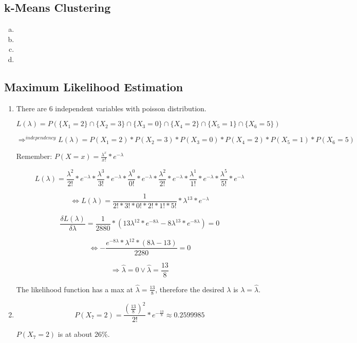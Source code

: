 \documentclass[12pt]{article}
\begin{document}

\setcounter{section}{4}

\subsection{k-Means Clustering}
\begin{enumerate}[a)]

    \item 
      

    \item 

    \item 

    \item 
        
\end{enumerate}

\subsection{Maximum Likelihood Estimation}

	\begin{enumerate}
	
	\item

	There are 6 independent variables with poisson distribution.
	
	$$L(\lambda)= P(\{X_1=2\} \cap \{X_2=3\} \cap \{X_3=0\} \cap \{X_4=2\} \cap \{X_5=1\} \cap \{X_6=5\})$$
	
	$$\Rightarrow^{independency} L(\lambda)= P(X_1=2) * P(X_2=3) * P(X_3=0) * P(X_4=2) * P(X_5=1) * P(X_6=5)$$
	
	Remember: $P(X=x)= \frac{\lambda^x}{x!}*e^{-\lambda}$
	
	$$L(\lambda)= \frac{\lambda^2}{2!}*e^{-\lambda} * \frac{\lambda^3}{3!}*e^{-\lambda} * \frac{\lambda^0}{0!}*e^{-\lambda} * \frac{\lambda^2}{2!}*e^{-\lambda} * \frac{\lambda^1}{1!}*e^{-\lambda} * \frac{\lambda^5}{5!}*e^{-\lambda} $$
	
	$$ \Leftrightarrow L(\lambda)= \frac{1}{2!*3!*0!*2!*1!*5!} * \lambda^{13} * e^{-\lambda} $$
	
	$$ \frac{\delta L(\lambda)}{\delta \lambda} = \frac{1}{2880}*(13\lambda^{12}*e^{-8\lambda} -8\lambda^{13}*e^{-8\lambda})=0$$
	
	$$ \Leftrightarrow -\frac{e^{-8\lambda}*\lambda^{12}*(8\lambda-13)}{2280} = 0 $$
	
	$$ \Rightarrow \hat{\lambda}=0 \vee \hat{\lambda}=\frac{13}{8} $$
	
	The likelihood function has a max at $\hat{\lambda}=\frac{13}{8}$, therefore the desired $\lambda$ is $\lambda=\hat{\lambda}$.

	\item	
	
	$$ P(X_7=2) = \frac{(\frac{13}{8})^2}{2!} * e^{-\frac{13}{8}} \approx 0.2599985 $$
	
	$ P(X_7=2)$ is at about 26\%.
	
	\end{enumerate}
\end{document}
